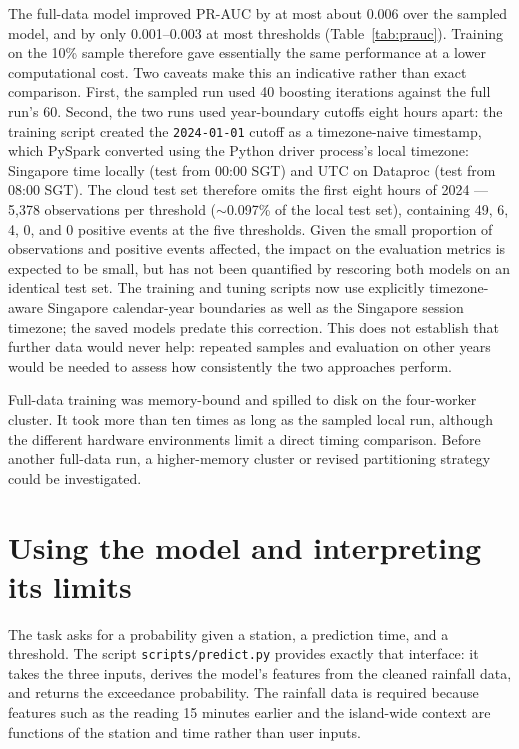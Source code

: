 \documentclass[11pt]{article}
\begin{document}
The full-data model improved PR-AUC by at most about 0.006 over the sampled model, and by only 0.001--0.003 at most thresholds (Table~\ref{tab:prauc}). Training on the 10\% sample therefore gave essentially the same performance at a lower computational cost. Two caveats make this an indicative rather than exact comparison. First, the sampled run used 40 boosting iterations against the full run's 60. Second, the two runs used year-boundary cutoffs eight hours apart: the training script created the \texttt{2024-01-01} cutoff as a timezone-naive timestamp, which PySpark converted using the Python driver process's local timezone: Singapore time locally (test from 00:00 SGT) and UTC on Dataproc (test from 08:00 SGT). The cloud test set therefore omits the first eight hours of 2024 --- 5{,}378 observations per threshold ($\sim$0.097\% of the local test set), containing 49, 6, 4, 0, and 0 positive events at the five thresholds. Given the small proportion of observations and positive events affected, the impact on the evaluation metrics is expected to be small, but has not been quantified by rescoring both models on an identical test set. The training and tuning scripts now use explicitly timezone-aware Singapore calendar-year boundaries as well as the Singapore session timezone; the saved models predate this correction. This does not establish that further data would never help: repeated samples and evaluation on other years would be needed to assess how consistently the two approaches perform.

Full-data training was memory-bound and spilled to disk on the four-worker cluster. It took more than ten times as long as the sampled local run, although the different hardware environments limit a direct timing comparison. Before another full-data run, a higher-memory cluster or revised partitioning strategy could be investigated.

\section{Using the model and interpreting its limits}

The task asks for a probability given a station, a prediction time, and a threshold. The script \texttt{scripts/predict.py} provides exactly that interface: it takes the three inputs, derives the model's features from the cleaned rainfall data, and returns the exceedance probability. The rainfall data is required because features such as the reading 15 minutes earlier and the island-wide context are functions of the station and time rather than user inputs.
\end{document}
